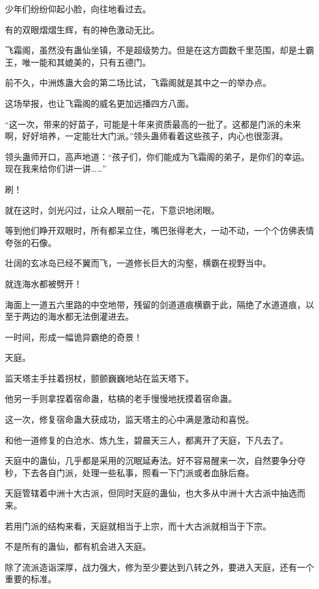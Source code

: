 \begin{this_body}
少年们纷纷仰起小脸，向往地看过去。

有的双眼熠熠生辉，有的神色激动无比。

飞霜阁，虽然没有蛊仙坐镇，不是超级势力。但是在这方圆数千里范围，却是土霸王，唯一能和其媲美的，只有五德门。

前不久，中洲炼蛊大会的第二场比试，飞霜阁就是其中之一的举办点。

这场举报，也让飞霜阁的威名更加远播四方八面。

“这一次，带来的好苗子，可能是十年来资质最高的一批了。这都是门派的未来啊，好好培养，一定能壮大门派。”领头蛊师看着这些孩子，内心也很澎湃。

领头蛊师开口，高声地道：“孩子们，你们能成为飞霜阁的弟子，是你们的幸运。现在我来给你们讲一讲……”

刷！

就在这时，剑光闪过，让众人眼前一花，下意识地闭眼。

等到他们睁开双眼时，所有都呆立住，嘴巴张得老大，一动不动，一个个仿佛表情夸张的石像。

壮阔的玄冰岛已经不翼而飞，一道修长巨大的沟壑，横霸在视野当中。

就连海水都被劈开！

海面上一道五六里路的中空地带，残留的剑道道痕横霸于此，隔绝了水道道痕，以至于两边的海水都无法倒灌进去。

一时间，形成一幅诡异霸绝的奇景！

天庭。

监天塔主手拄着拐杖，颤颤巍巍地站在监天塔下。

他另一手则拿捏着宿命蛊，枯槁的老手慢慢地抚摸着宿命蛊。

这一次，修复宿命蛊大获成功，监天塔主的心中满是激动和喜悦。

和他一道修复的白沧水、炼九生，碧晨天三人，都离开了天庭，下凡去了。

天庭中的蛊仙，几乎都是采用的沉眠延寿法。好不容易醒来一次，自然要争分夺秒，下去各自门派，处理一些私事，照看一下门派或者血脉后裔。

天庭管辖着中洲十大古派，但同时天庭的蛊仙，也大多从中洲十大古派中抽选而来。

若用门派的结构来看，天庭就相当于上宗，而十大古派就相当于下宗。

不是所有的蛊仙，都有机会进入天庭。

除了流派造诣深厚，战力强大，修为至少要达到八转之外，要进入天庭，还有一个重要的标准。


\end{this_body}
